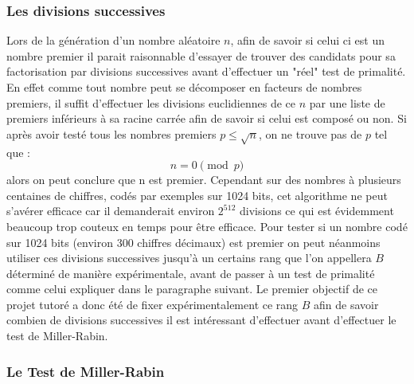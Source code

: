 \documentclass{article}
\begin{document}
\subsubsection{Les divisions successives}
Lors de la génération d'un nombre aléatoire $n$, afin de savoir si celui ci est un nombre premier il parait raisonnable d'essayer de trouver des candidats pour sa factorisation par divisions successives avant d'effectuer un "réel" test de primalité. En effet comme tout nombre peut se décomposer en facteurs de nombres premiers, il suffit d'effectuer les divisions euclidiennes de ce $n$ par une liste de premiers inférieurs à sa racine carrée afin de savoir si celui est composé ou non. Si après avoir testé tous les nombres premiers  $ p \leq \sqrt{n}$, on ne trouve pas de $p$ tel que : $$n=0\pmod{p}$$ alors on peut conclure que n est premier. Cependant sur des nombres à plusieurs centaines de chiffres, codés par exemples sur 1024 bits, cet algorithme ne peut s'avérer efficace car il demanderait environ $ 2^{512} $ divisions ce qui est évidemment beaucoup trop couteux en temps pour être efficace. 
Pour tester si un nombre codé sur 1024 bits (environ 300 chiffres décimaux) est premier on peut néanmoins utiliser ces divisions successives jusqu'à un certains rang que l'on appellera $B$ déterminé de manière expérimentale, avant de passer à un test de primalité comme celui expliquer dans le paragraphe suivant. 
Le premier objectif de ce projet tutoré a donc été de fixer expérimentalement ce rang $B$ afin de savoir combien de divisions successives il est intéressant d'effectuer avant d'effectuer le test de Miller-Rabin.

\subsubsection{Le Test de Miller-Rabin}
\end{document}
